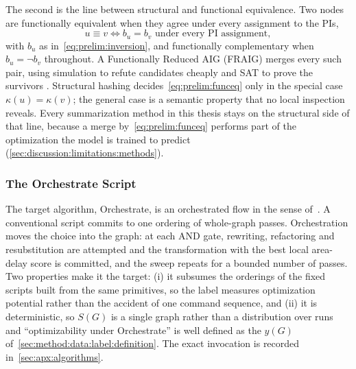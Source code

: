 The second is the line between structural and functional equivalence. Two nodes are
functionally equivalent when they agree under every assignment to the PIs,
\begin{equation}
    u \equiv v \iff b_u = b_v \text{ under every PI assignment},
    \label{eq:prelim:funceq}
\end{equation}
with $b_u$ as in~\eqref{eq:prelim:inversion}, and functionally complementary when
$b_u = \neg b_v$ throughout. A Functionally Reduced AIG (FRAIG) merges every such pair,
using simulation to refute candidates cheaply and SAT to prove the survivors
\citep{mishchenko2005fraig}. Structural hashing decides~\eqref{eq:prelim:funceq} only in
the special case $\kappa(u) = \kappa(v)$; the general case is a semantic property that no
local inspection reveals. Every summarization method in this thesis stays on the
structural side of that line, because a merge by~\eqref{eq:prelim:funceq} performs part of
the optimization the model is trained to predict
(\ref{sec:discussion:limitations:methods}).

\subsubsection{The Orchestrate Script}
\label{sec:prelim:algorithms:orchestrate}
The target algorithm, Orchestrate, is an orchestrated flow in the sense
of~\citet{li2024orchestration}. A conventional script commits to one ordering of
whole-graph passes. Orchestration moves the choice into the graph: at each AND gate,
rewriting, refactoring and resubstitution are attempted and the transformation with the
best local area-delay score is committed, and the sweep repeats for a bounded number of
passes. Two properties make it the target: (i) it subsumes the orderings of the fixed
scripts built from the same primitives, so the label measures optimization potential
rather than the accident of one command sequence, and (ii) it is deterministic, so $S(G)$
is a single graph rather than a distribution over runs and ``optimizability under
Orchestrate'' is well defined as the $y(G)$ of~\ref{sec:method:data:label:definition}. The
exact invocation is recorded in~\ref{sec:apx:algorithms}.

